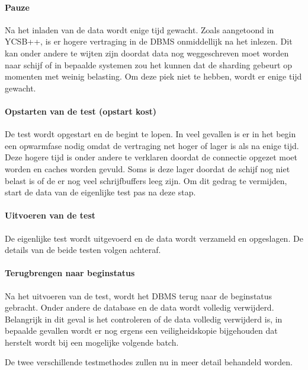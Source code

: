 \paragraph{Pauze} Na het inladen van de data wordt enige tijd gewacht. Zoals aangetoond in YCSB++\cite[Figuur 9]{patil2011ycsb++}, is er hogere vertraging in de DBMS onmiddellijk na het inlezen. Dit kan onder andere te wijten zijn doordat data nog weggeschreven moet worden naar schijf of in bepaalde systemen zou het kunnen dat de sharding gebeurt op momenten met weinig belasting. Om deze piek niet te hebben, wordt er enige tijd gewacht. 

\paragraph{Opstarten van de test (opstart kost)} De test wordt opgestart en de begint te lopen. In veel gevallen is er in het begin een opwarmfase nodig omdat de vertraging net hoger of lager is als na enige tijd. Deze hogere tijd is onder andere te verklaren doordat de connectie opgezet moet worden en caches worden gevuld. Soms is deze lager doordat de schijf nog niet belast is of de er nog veel schrijfbuffers leeg zijn. Om dit gedrag te vermijden, start de data van de eigenlijke test pas na deze stap. 

\paragraph{Uitvoeren van de test} De eigenlijke test wordt uitgevoerd en de data wordt verzameld en opgeslagen. De details van de beide testen volgen achteraf. 

\paragraph{Terugbrengen naar beginstatus} Na het uitvoeren van de test, wordt het DBMS terug naar de beginstatus gebracht. Onder andere de database en de data wordt volledig verwijderd. Belangrijk in dit geval is het controleren of de data volledig verwijderd is, in bepaalde gevallen wordt er nog ergens een veiligheidskopie bijgehouden dat herstelt wordt bij een mogelijke volgende batch. 

De twee verschillende testmethodes zullen nu in meer detail behandeld worden. 
